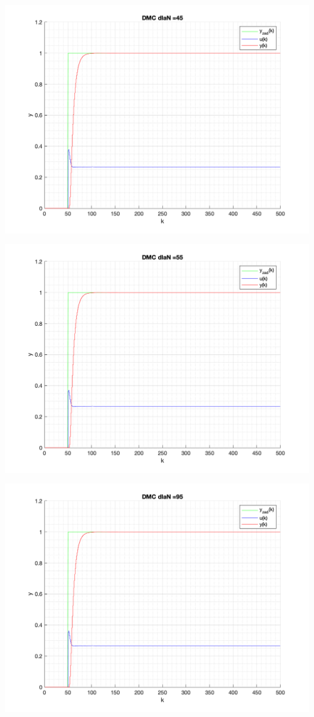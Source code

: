 \documentclass[a4paper, 11pt]{article}
\begin{document}
\begin{enumerate}
 \includegraphics[width=\linewidth]{./ModelsP4_N/P4_DMC_N_45_png.png} 
 
 \includegraphics[width=\linewidth]{./ModelsP4_N/P4_DMC_N_55_png.png} 
 
 \includegraphics[width=\linewidth]{./ModelsP4_N/P4_DMC_N_95_png.png} 
 

\end{enumerate}
\end{document}
